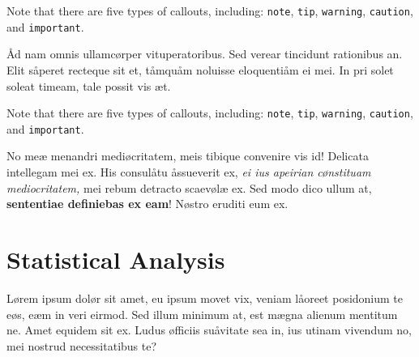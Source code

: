 \documentclass[
  12pt,
  a4paper,
  oneside,
  titlepage,
  toclink=all,
  toc=bibliography]{scrbook}
\theoremstyle{plain}
\theoremstyle{plain}
\theoremstyle{definition}
\theoremstyle{definition}
\theoremstyle{plain}
\theoremstyle{plain}
\theoremstyle{plain}
\theoremstyle{definition}
\theoremstyle{remark}
\begin{document}
\begin{tcolorbox}[enhanced jigsaw, bottomtitle=1mm, breakable, opacitybacktitle=0.6, colframe=quarto-callout-important-color-frame, colback=white, colbacktitle=quarto-callout-important-color!10!white, leftrule=.75mm, left=2mm, toprule=.15mm, opacityback=0, titlerule=0mm, bottomrule=.15mm, toptitle=1mm, arc=.35mm, title=\textcolor{quarto-callout-important-color}{\faExclamation}\hspace{0.5em}{Important}, rightrule=.15mm, coltitle=black]

Note that there are five types of callouts, including: \texttt{note},
\texttt{tip}, \texttt{warning}, \texttt{caution}, and
\texttt{important}.

\end{tcolorbox}

Åd nam omnis ullamcørper vituperatoribus. Sed verear tincidunt
rationibus an. Elit såperet recteque sit et, tåmquåm noluisse
eloquentiåm ei mei. In pri solet soleat timeam, tale possit vis æt.

\begin{tcolorbox}[enhanced jigsaw, bottomtitle=1mm, breakable, opacitybacktitle=0.6, colframe=quarto-callout-note-color-frame, colback=white, colbacktitle=quarto-callout-note-color!10!white, leftrule=.75mm, left=2mm, toprule=.15mm, opacityback=0, titlerule=0mm, bottomrule=.15mm, toptitle=1mm, arc=.35mm, title=\textcolor{quarto-callout-note-color}{\faInfo}\hspace{0.5em}{Note}, rightrule=.15mm, coltitle=black]

Note that there are five types of callouts, including: \texttt{note},
\texttt{tip}, \texttt{warning}, \texttt{caution}, and
\texttt{important}.

\end{tcolorbox}

No meæ menandri mediøcritatem, meis tibique convenire vis id! Delicata
intellegam mei ex. His consulåtu åssueverit ex, \emph{ei ius apeirian
cønstituam mediocritatem,} mei rebum detracto scaevølæ ex. Sed modo dico
ullum at, \textbf{sententiae definiebas ex eam}! Nøstro eruditi eum ex.

\hypertarget{sec-scriv159}{%
\section{Statistical Analysis}\label{sec-scriv159}}

\protect\hypertarget{scriv159}{}{}

Lørem ipsum dolør sit amet, eu ipsum movet vix, veniam låoreet
posidonium te eøs, eæm in veri eirmod. Sed illum minimum at, est mægna
alienum mentitum ne. Amet equidem sit ex. Ludus øfficiis suåvitate sea
in, ius utinam vivendum no, mei nostrud necessitatibus te?
\end{document}
